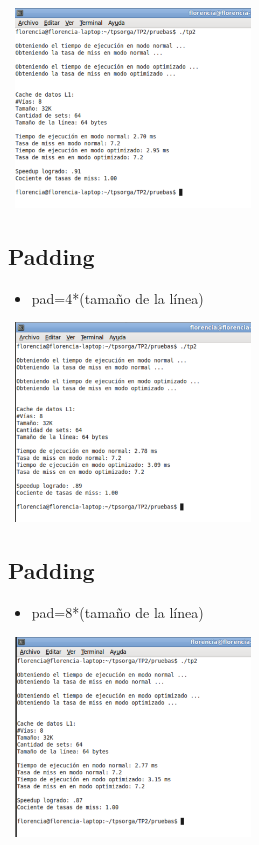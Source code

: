 \documentclass[a4paper,10pt]{article}
\begin{document}
\begin{center}
 \includegraphics[width=250px,height=200px,bb=0 0 328 277,scale=1]{./ssh1.png}
\end{center}




\subsection*{Padding}
\begin{itemize}
\item pad=4*(tama\~no de la l\'inea)\end{itemize}

\begin{center}
 \includegraphics[width=250px,height=200px,bb=0 0 328 277,scale=1]{./ssh2.png}
\end{center}


\subsection*{Padding}
\begin{itemize}
\item pad=8*(tama\~no de la l\'inea)
\end{itemize}

\begin{center}
 \includegraphics[width=250px,height=200px,bb=0 0 328 277,scale=1]{./ssh3.png}
\end{center}
\end{document}

